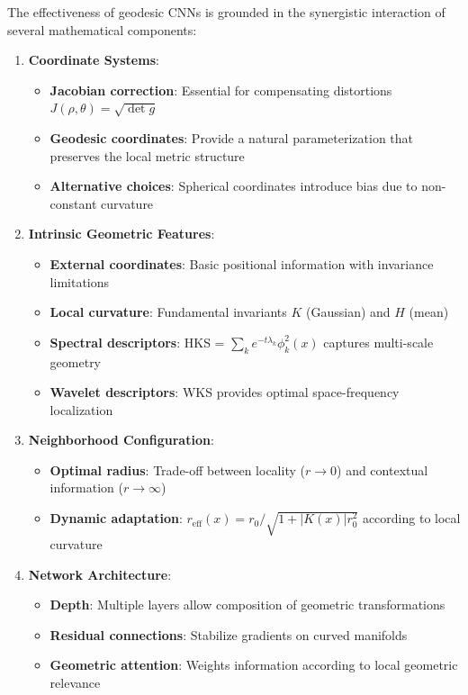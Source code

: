 \begin{remark}\label{rem:analisis_contribuciones_teoricas}
The effectiveness of geodesic CNNs is grounded in the synergistic interaction of several mathematical components:

\begin{enumerate}
    \item \textbf{Coordinate Systems}:
    \begin{itemize}
        \item \textbf{Jacobian correction}: Essential for compensating distortions $J(\rho, \theta) = \sqrt{\det g}$
        \item \textbf{Geodesic coordinates}: Provide a natural parameterization that preserves the local metric structure
        \item \textbf{Alternative choices}: Spherical coordinates introduce bias due to non-constant curvature
    \end{itemize}

    \item \textbf{Intrinsic Geometric Features}:
    \begin{itemize}
        \item \textbf{External coordinates}: Basic positional information with invariance limitations
        \item \textbf{Local curvature}: Fundamental invariants $K$ (Gaussian) and $H$ (mean)
        \item \textbf{Spectral descriptors}: HKS = $\sum_k e^{-t\lambda_k} \phi_k^2(x)$ captures multi-scale geometry
        \item \textbf{Wavelet descriptors}: WKS provides optimal space-frequency localization
    \end{itemize}

    \item \textbf{Neighborhood Configuration}:
    \begin{itemize}
        \item \textbf{Optimal radius}: Trade-off between locality ($r \to 0$) and contextual information ($r \to \infty$)
        \item \textbf{Dynamic adaptation}: $r_{\text{eff}}(x) = r_0 / \sqrt{1 + |K(x)| r_0^2}$ according to local curvature
    \end{itemize}

    \item \textbf{Network Architecture}:
    \begin{itemize}
        \item \textbf{Depth}: Multiple layers allow composition of geometric transformations
        \item \textbf{Residual connections}: Stabilize gradients on curved manifolds
        \item \textbf{Geometric attention}: Weights information according to local geometric relevance
    \end{itemize}
\end{enumerate}
\end{remark}

